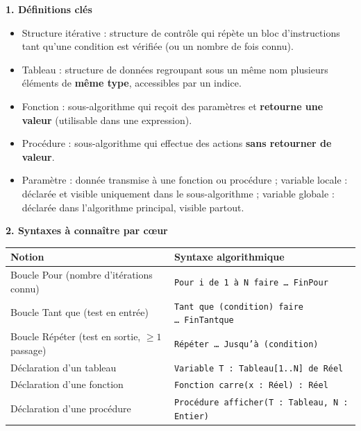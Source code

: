 \documentclass[11pt]{article}
\newcommand{\cle}[1]{{\popxbold\color{popdark}#1}}
\begin{document}
\begin{bilan}
\textbf{1. Définitions clés}
\begin{itemize}
  \item \cle{Structure itérative} : structure de contrôle qui répète un bloc d'instructions tant qu'une condition est vérifiée (ou un nombre de fois connu).
  \item \cle{Tableau} : structure de données regroupant sous un même nom plusieurs éléments de \textbf{même type}, accessibles par un \cle{indice}.
  \item \cle{Fonction} : sous-algorithme qui reçoit des paramètres et \textbf{retourne une valeur} (utilisable dans une expression).
  \item \cle{Procédure} : sous-algorithme qui effectue des actions \textbf{sans retourner de valeur}.
  \item \cle{Paramètre} : donnée transmise à une fonction ou procédure ; \cle{variable locale} : déclarée et visible uniquement dans le sous-algorithme ; \cle{variable globale} : déclarée dans l'algorithme principal, visible partout.
\end{itemize}

\textbf{2. Syntaxes à connaître par c\oe ur}
\begin{center}
\begin{tabularx}{\linewidth}{|l|X|}
\hline
\rowcolor{popblueL} \textbf{Notion} & \textbf{Syntaxe algorithmique} \\
\hline
Boucle Pour (nombre d'itérations connu) & \texttt{Pour i de 1 à N faire \ldots\ FinPour} \\
\hline
Boucle Tant que (test en entrée) & \texttt{Tant que (condition) faire \ldots\ FinTantque} \\
\hline
Boucle Répéter (test en sortie, $\geq 1$ passage) & \texttt{Répéter \ldots\ Jusqu'à (condition)} \\
\hline
Déclaration d'un tableau & \texttt{Variable T : Tableau[1..N] de Réel} \\
\hline
Déclaration d'une fonction & \texttt{Fonction carre(x : Réel) : Réel} \\
\hline
Déclaration d'une procédure & \texttt{Procédure afficher(T : Tableau, N : Entier)} \\
\hline
\end{tabularx}
\end{center}


\end{bilan}
\end{document}
